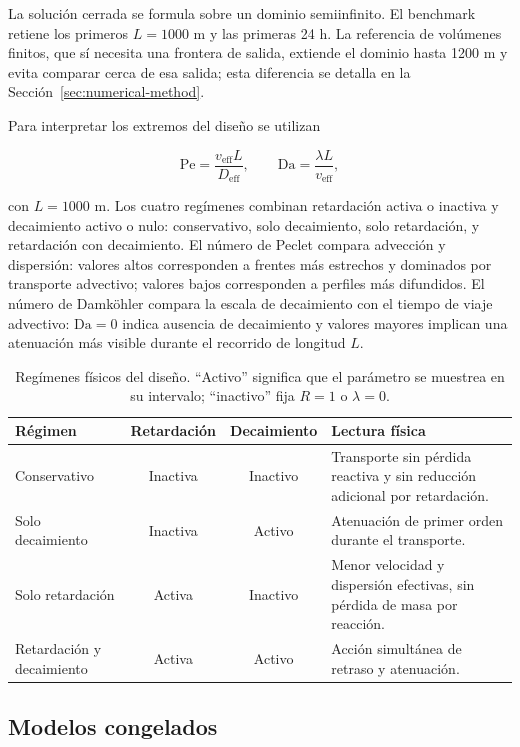 \documentclass[11pt,a4paper]{article}
\begin{document}
La solución cerrada se formula sobre un dominio semiinfinito. El benchmark
retiene los primeros $L=1000$ m y las primeras 24 h. La referencia de volúmenes
finitos, que sí necesita una frontera de salida, extiende el dominio hasta
1200 m y evita comparar cerca de esa salida; esta diferencia se detalla en la
Sección~\ref{sec:numerical-method}.

Para interpretar los extremos del diseño se utilizan

\begin{equation}
\mathrm{Pe}=\frac{v_{\mathrm{eff}}L}{D_{\mathrm{eff}}},
\qquad
\mathrm{Da}=\frac{\lambda L}{v_{\mathrm{eff}}},
\end{equation}

con $L=1000$ m. Los cuatro regímenes combinan retardación activa o inactiva y
decaimiento activo o nulo: conservativo, solo decaimiento, solo retardación, y
retardación con decaimiento. El número de Peclet compara advección y dispersión:
valores altos corresponden a frentes más estrechos y dominados por transporte
advectivo; valores bajos corresponden a perfiles más difundidos. El número de
Damköhler compara la escala de decaimiento con el tiempo de viaje advectivo:
$\mathrm{Da}=0$ indica ausencia de decaimiento y valores mayores implican una
atenuación más visible durante el recorrido de longitud $L$.

\begin{table}[htbp]
\centering
\caption{Regímenes físicos del diseño. ``Activo'' significa que el parámetro se
muestrea en su intervalo; ``inactivo'' fija $R=1$ o $\lambda=0$.}
\label{tab:regimes}
\small
\begin{tabularx}{\textwidth}{@{}YccY@{}}
\toprule
Régimen & Retardación & Decaimiento & Lectura física \\
\midrule
Conservativo & Inactiva & Inactivo & Transporte sin pérdida reactiva y sin
reducción adicional por retardación. \\
Solo decaimiento & Inactiva & Activo & Atenuación de primer orden durante el
transporte. \\
Solo retardación & Activa & Inactivo & Menor velocidad y dispersión efectivas,
sin pérdida de masa por reacción. \\
Retardación y decaimiento & Activa & Activo & Acción simultánea de retraso y
atenuación. \\
\bottomrule
\end{tabularx}
\end{table}

\subsection{Modelos congelados}
\end{document}
